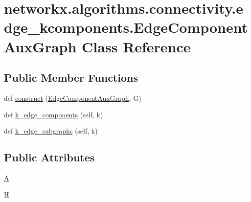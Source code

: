 \hypertarget{classnetworkx_1_1algorithms_1_1connectivity_1_1edge__kcomponents_1_1EdgeComponentAuxGraph}{}\section{networkx.\+algorithms.\+connectivity.\+edge\+\_\+kcomponents.\+Edge\+Component\+Aux\+Graph Class Reference}
\label{classnetworkx_1_1algorithms_1_1connectivity_1_1edge__kcomponents_1_1EdgeComponentAuxGraph}
\subsection*{Public Member Functions}
\begin{DoxyCompactItemize}
\item 
def \hyperlink{classnetworkx_1_1algorithms_1_1connectivity_1_1edge__kcomponents_1_1EdgeComponentAuxGraph_a08fef06d73ac430968ec0a9af50d47f4}{construct} (\hyperlink{classnetworkx_1_1algorithms_1_1connectivity_1_1edge__kcomponents_1_1EdgeComponentAuxGraph}{Edge\+Component\+Aux\+Graph}, G)
\item 
def \hyperlink{classnetworkx_1_1algorithms_1_1connectivity_1_1edge__kcomponents_1_1EdgeComponentAuxGraph_a7384a832c991efc3144d5da40f7731a2}{k\+\_\+edge\+\_\+components} (self, k)
\item 
def \hyperlink{classnetworkx_1_1algorithms_1_1connectivity_1_1edge__kcomponents_1_1EdgeComponentAuxGraph_af05d806dd8d485ce8980d532c7b4d3d8}{k\+\_\+edge\+\_\+subgraphs} (self, k)
\end{DoxyCompactItemize}
\subsection*{Public Attributes}
\begin{DoxyCompactItemize}
\item 
\hyperlink{classnetworkx_1_1algorithms_1_1connectivity_1_1edge__kcomponents_1_1EdgeComponentAuxGraph_a6b1c7a28cf70062fb18dcad380c3c206}{A}
\item 
\hyperlink{classnetworkx_1_1algorithms_1_1connectivity_1_1edge__kcomponents_1_1EdgeComponentAuxGraph_a39a95360ec34ecb50801415a8ce336e0}{H}
\end{DoxyCompactItemize}


